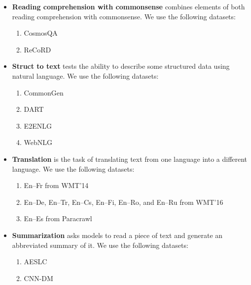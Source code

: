 \begin{itemize}[leftmargin=*]
    We use the following datasets:
    \begin{enumerate}
        \item DPR \citep{rahman-ng-2012-resolving}
        \item Winogrande \citep{sakaguchi2020winogrande}
        \item WSC273 \citep{levesque2012winograd}
    \end{enumerate}
    \item \textbf{Reading comprehension with commonsense} combines elements of both reading comprehension with commonsense.
    We use the following datasets:
    \begin{enumerate}
        \item CosmosQA \citep{huang-etal-2019-cosmos}
        \item ReCoRD \citep{DBLP:journals/corr/abs-1810-12885}
    \end{enumerate}
    \item \textbf{Struct to text} tests the ability to describe some structured data using natural language. 
    We use the following datasets:
    \begin{enumerate}
        \item CommonGen \citep{lin-etal-2020-commongen}
        \item DART \citep{nan-etal-2021-dart}
        \item E2ENLG \citep{dusek-etal-2019-semantic}
        \item WebNLG \citep{gardent-etal-2017-webnlg}
    \end{enumerate}
    \item \textbf{Translation} is the task of translating text from one language into a different language. We use the following datasets:
    \begin{enumerate}
        \item En--Fr from WMT'14 \citep{wmt14}
        \item En--De, En--Tr, En--Cs, En--Fi, En--Ro, and En--Ru from WMT'16 \citep{wmt16}
        \item En--Es from Paracrawl \citep{banon-etal-2020-paracrawl}
    \end{enumerate}
    \item \textbf{Summarization} asks models to read a piece of text and generate an abbreviated summary of it.
    We use the following datasets:
    \begin{enumerate}
        \item AESLC \citep{zhang2019slg}
        \item CNN-DM \citep{see-etal-2017-get}

\end{enumerate}
\end{itemize}
